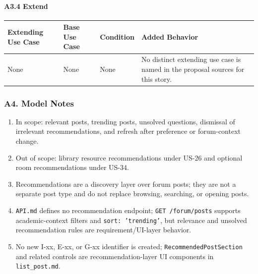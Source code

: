 \documentclass[12pt]{article}
\renewcommand{\baselinestretch}{1.5}
\begin{document}
\hypertarget{sec:a3-4-extend}{}
\paragraph*{A3.4 Extend}
\par\medskip

\begingroup
\small
\renewcommand{\baselinestretch}{1.0}\selectfont
\renewcommand{\arraystretch}{1.15}
\setlength{\tabcolsep}{6pt}
\begin{longtable}{|>{\raggedright\arraybackslash}p{}|>{\raggedright\arraybackslash}p{}|>{\raggedright\arraybackslash}p{}|>{\raggedright\arraybackslash}p{}|}
\hline
\textbf{Extending Use Case} & \textbf{Base Use Case} & \textbf{Condition} & \textbf{Added Behavior} \\ \hline
\endhead
None & None & None & No distinct extending use case is named in the proposal sources for this story. \\ \hline
\end{longtable}
\endgroup
\par\medskip

\hypertarget{sec:a4-model-notes}{}
\subsubsection*{A4. Model Notes}
\par\medskip

\begin{enumerate}
\item In scope: relevant posts, trending posts, unsolved questions, dismissal of irrelevant recommendations, and refresh after preference or forum-context change.
\item Out of scope: library resource recommendations under US-26 and optional room recommendations under US-34.
\item Recommendations are a discovery layer over forum posts; they are not a separate post type and do not replace browsing, searching, or opening posts.
\item \texttt{API.md} defines no recommendation endpoint; \texttt{GET /forum/posts} supports academic-context filters and \texttt{sort: 'trending'}, but relevance and unsolved recommendation rules are requirement/UI-layer behavior.
\item No new I-xx, E-xx, or G-xx identifier is created; \texttt{RecommendedPostSection} and related controls are recommendation-layer UI components in \texttt{list\_post.md}.
\end{enumerate}
\par\medskip
\end{document}
